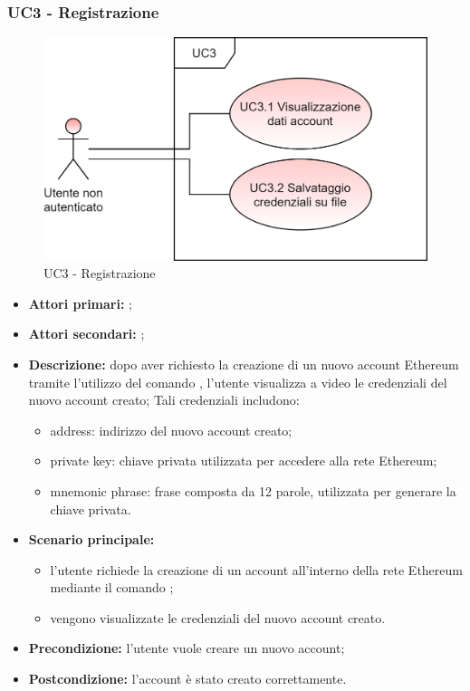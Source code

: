 \subsubsection{UC3 - Registrazione}
\begin{figure}[H]
	\centering
	\includegraphics[scale=\ucs]{./res/img/UC3.png}
	\caption {UC3 - Registrazione}
\end{figure}
\begin{itemize}
	\item \textbf{Attori primari:} \una{};
	\item \textbf{Attori secondari:} \re{};
	\item \textbf{Descrizione:} dopo aver richiesto la creazione di un nuovo account Ethereum tramite l’utilizzo del comando \signup{}, l’utente visualizza a video le credenziali del nuovo account creato; Tali credenziali includono:
	\begin{itemize}
		\item address: indirizzo del nuovo account creato;
		\item private key: chiave privata utilizzata per accedere alla rete Ethereum;
		\item mnemonic phrase: frase composta da 12 parole, utilizzata per generare la chiave privata.
	\end{itemize}
	\item \textbf{Scenario principale:}
	\begin{itemize}
		\item l’utente richiede la creazione di un account all’interno della rete Ethereum mediante il comando \signup{};
		\item vengono visualizzate le credenziali del nuovo account creato. 
	\end{itemize}
	\item \textbf{Precondizione:} l'utente vuole creare un nuovo account; 
	\item \textbf{Postcondizione:} l’account è stato creato correttamente. 
\end{itemize}